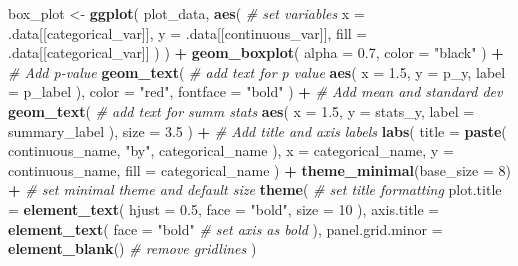 \documentclass[
]{article}
\newenvironment{Shaded}{\begin{snugshade}}{\end{snugshade}}
\newcommand{\AttributeTok}[1]{\textcolor[rgb]{0.13,0.29,0.53}{#1}}
\newcommand{\CommentTok}[1]{\textcolor[rgb]{0.56,0.35,0.01}{\textit{#1}}}
\newcommand{\DecValTok}[1]{\textcolor[rgb]{0.00,0.00,0.81}{#1}}
\newcommand{\FloatTok}[1]{\textcolor[rgb]{0.00,0.00,0.81}{#1}}
\newcommand{\FunctionTok}[1]{\textcolor[rgb]{0.13,0.29,0.53}{\textbf{#1}}}
\newcommand{\NormalTok}[1]{#1}
\newcommand{\OtherTok}[1]{\textcolor[rgb]{0.56,0.35,0.01}{#1}}
\newcommand{\SpecialCharTok}[1]{\textcolor[rgb]{0.81,0.36,0.00}{\textbf{#1}}}
\newcommand{\StringTok}[1]{\textcolor[rgb]{0.31,0.60,0.02}{#1}}
\begin{document}
\begin{Shaded}
\begin{Highlighting}[]
\NormalTok{  box\_plot }\OtherTok{\textless{}{-}} \FunctionTok{ggplot}\NormalTok{(}
\NormalTok{    plot\_data,}
    \FunctionTok{aes}\NormalTok{( }\CommentTok{\# set variables}
      \AttributeTok{x =}\NormalTok{ .data[[categorical\_var]],}
      \AttributeTok{y =}\NormalTok{ .data[[continuous\_var]],}
      \AttributeTok{fill =}\NormalTok{ .data[[categorical\_var]]}
\NormalTok{    )}
\NormalTok{  ) }\SpecialCharTok{+}
  \FunctionTok{geom\_boxplot}\NormalTok{(}
      \AttributeTok{alpha =} \FloatTok{0.7}\NormalTok{,}
      \AttributeTok{color =} \StringTok{"black"}
\NormalTok{    ) }\SpecialCharTok{+}
    \CommentTok{\# Add p{-}value}
    \FunctionTok{geom\_text}\NormalTok{( }\CommentTok{\# add text for p value}
      \FunctionTok{aes}\NormalTok{(}
        \AttributeTok{x =} \FloatTok{1.5}\NormalTok{,}
        \AttributeTok{y =}\NormalTok{ p\_y,}
        \AttributeTok{label =}\NormalTok{ p\_label}
\NormalTok{      ),}
      \AttributeTok{color =} \StringTok{"red"}\NormalTok{,}
      \AttributeTok{fontface =} \StringTok{"bold"}
\NormalTok{    ) }\SpecialCharTok{+}
    \CommentTok{\# Add mean and standard dev}
    \FunctionTok{geom\_text}\NormalTok{( }\CommentTok{\# add text for summ stats}
      \FunctionTok{aes}\NormalTok{(}
        \AttributeTok{x =} \FloatTok{1.5}\NormalTok{,}
        \AttributeTok{y =}\NormalTok{ stats\_y,}
        \AttributeTok{label =}\NormalTok{ summary\_label}
\NormalTok{      ),}
      \AttributeTok{size =} \FloatTok{3.5}
\NormalTok{    ) }\SpecialCharTok{+}
    \CommentTok{\# Add title and axis labels}
    \FunctionTok{labs}\NormalTok{(}
      \AttributeTok{title =} \FunctionTok{paste}\NormalTok{(}
\NormalTok{        continuous\_name,}
        \StringTok{"by"}\NormalTok{,}
\NormalTok{        categorical\_name}
\NormalTok{      ),}
      \AttributeTok{x =}\NormalTok{ categorical\_name,}
      \AttributeTok{y =}\NormalTok{ continuous\_name,}
      \AttributeTok{fill =}\NormalTok{ categorical\_name}
\NormalTok{    ) }\SpecialCharTok{+}
    \FunctionTok{theme\_minimal}\NormalTok{(}\AttributeTok{base\_size =} \DecValTok{8}\NormalTok{) }\SpecialCharTok{+} \CommentTok{\# set minimal theme and default size}
    \FunctionTok{theme}\NormalTok{( }\CommentTok{\# set title formatting}
      \AttributeTok{plot.title =} \FunctionTok{element\_text}\NormalTok{(}
        \AttributeTok{hjust =} \FloatTok{0.5}\NormalTok{,}
        \AttributeTok{face =} \StringTok{"bold"}\NormalTok{,}
        \AttributeTok{size =} \DecValTok{10}
\NormalTok{      ),}
      \AttributeTok{axis.title =} \FunctionTok{element\_text}\NormalTok{(}
        \AttributeTok{face =} \StringTok{"bold"} \CommentTok{\# set axis as bold}
\NormalTok{      ),}
      \AttributeTok{panel.grid.minor =} \FunctionTok{element\_blank}\NormalTok{() }\CommentTok{\# remove gridlines}
\NormalTok{    )}
  

\end{Highlighting}
\end{Shaded}
\end{document}
